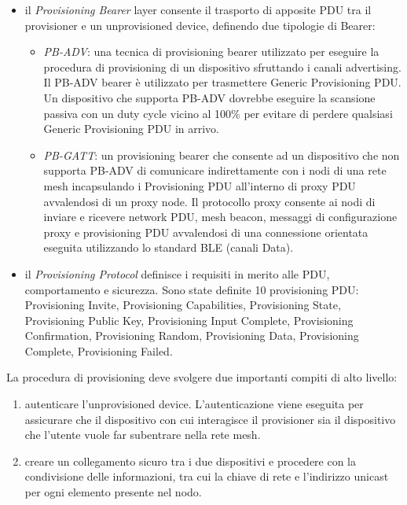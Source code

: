 \begin{itemize}
    \item il \textit{Provisioning Bearer} layer consente il trasporto di apposite PDU tra il provisioner e un unprovisioned device, definendo due tipologie di Bearer:
    \begin{itemize}
        \item \textit{PB-ADV}: una tecnica di provisioning bearer utilizzato per eseguire la procedura di provisioning di un dispositivo sfruttando i canali advertising. Il PB-ADV bearer è utilizzato per trasmettere Generic Provisioning PDU.\\
        Un dispositivo che supporta PB-ADV dovrebbe eseguire la scansione passiva con un duty cycle vicino al 100\% per evitare di perdere qualsiasi Generic Provisioning PDU in arrivo.
        
        \item \textit{PB-GATT}: un provisioning bearer che consente ad un dispositivo che non supporta PB-ADV di comunicare indirettamente con i nodi di una rete mesh incapsulando i Provisioning PDU all'interno di proxy PDU avvalendosi di un proxy node. Il protocollo proxy consente ai nodi di inviare e ricevere network PDU, mesh beacon, messaggi di configurazione proxy e provisioning PDU avvalendosi di una connessione orientata eseguita utilizzando lo standard BLE (canali Data).
    \end{itemize}
    
    \item il \textit{Provisioning Protocol} definisce i requisiti in merito alle PDU, comportamento e sicurezza. Sono state definite 10 provisioning PDU: Provisioning Invite, Provisioning Capabilities, Provisioning State, Provisioning Public Key, Provisioning Input Complete, Provisioning Confirmation, Provisioning Random, Provisioning Data, Provisioning Complete, Provisioning Failed.
\end{itemize}

\noindent La procedura di provisioning deve svolgere due importanti compiti di alto livello:
\begin{enumerate}
    \item autenticare l'unprovisioned device. L'autenticazione viene eseguita per assicurare che il dispositivo con cui interagisce il provisioner sia il dispositivo che l'utente vuole far subentrare nella rete mesh.
    
    \item creare un collegamento sicuro tra i due dispositivi e procedere con la condivisione delle informazioni, tra cui la chiave di rete e l'indirizzo unicast per ogni elemento presente nel nodo.
\end{enumerate}

